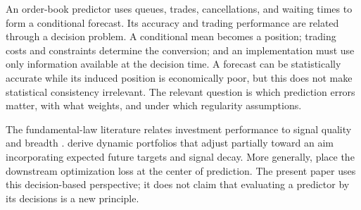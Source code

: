 \documentclass[11pt]{article}
\theoremstyle{plain}
\theoremstyle{definition}
\theoremstyle{remark}
\begin{document}
An order-book predictor uses queues, trades, cancellations, and waiting
times to form a conditional forecast. Its accuracy and trading performance
are related through a decision problem. A conditional mean becomes a position;
trading costs and constraints determine the conversion; and an
implementation must use only information available at the decision time.
A forecast can be statistically accurate while its induced position is
economically poor, but this does not make statistical consistency
irrelevant. The relevant question is which prediction errors matter,
with what weights, and under which regularity assumptions.

The fundamental-law literature relates investment performance to signal
quality and breadth \citep{Grinold1989,GrinoldKahn2000}.
\citet{GarleanuPedersen2013} derive dynamic portfolios that adjust
partially toward an aim incorporating expected future targets and signal
decay. More generally, \citet{ElmachtoubGrigas2022} place the downstream
optimization loss at the center of prediction. The present paper uses
this decision-based perspective; it does not claim that evaluating a
predictor by its decisions is a new principle.
\end{document}
